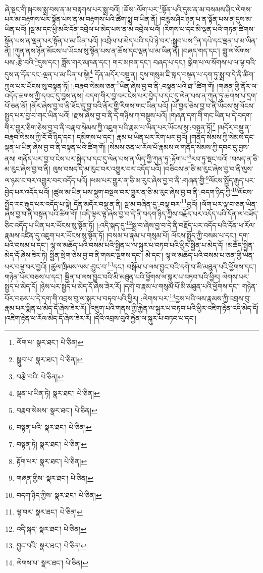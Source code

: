 ཞེ་སྡང་གི་སྐབས་སྨྲ་བས་ན་མ་བརྟགས་པར་སྨྲ་བའོ། །ཆོས་:ལོག་པར་\footnote{ལོག་པ་  སྣར་ཐང་།  པེ་ཅིན། }སྟོན་པའི་དུས་ན་མ་བསམས་ཤིང་ལེགས་པར་མ་བརྟགས་པར་སྟོན་པས་ན་མ་བརྟགས་པའི་ཚིག་སྨྲ་བ་ཡིན་ནོ། །བརྙས་ཤིང་ཉན་པ་ན་སྟོན་པས་ན་དུས་མ་ཡིན་པའོ། །སྔ་མ་དང་ཕྱི་མའི་དོན་འབྲེལ་པ་མེད་པས་ན་མ་འབྲེལ་པའོ། །རིགས་པ་དང་མི་ལྡན་པའི་གཏན་ཚིགས་སྟོན་པས་ན་ལྡན་པར་སྟོན་པ་མ་ཡིན་པའོ། །འབྲེལ་པ་མེད་པའི་དཔེ་ཉེ་བར་:སྒྲུབ་པས་\footnote{སྒྲུབ་པ་  སྣར་ཐང་།  པེ་ཅིན། }ན་དཔེ་དང་ལྡན་པ་མ་ཡིན་ནོ། །ཀུན་ནས་ཉོན་མོངས་པ་ཡོངས་སུ་སྟོན་པས་ན་ཆོས་དང་ལྡན་པ་མ་ཡིན་ནོ། །བཞད་གད་དང་། གླུ་ལ་སོགས་པས་:རྩེ་བའི་\footnote{བརྩེ་བའི་  པེ་ཅིན། }དུས་དང་། ཟློས་གར་མཁན་དང་། གར་མཁན་དང་། བཞད་པ་དང་། སྒེག་པ་ལ་སོགས་པ་ལ་ལྟ་བའི་དུས་ན་དོན་དང་:ལྡན་པ་མ་ཡིན་པ་སྟེ།\footnote{ལྡན་པ་ཡིན་ཏེ།  སྣར་ཐང་།  པེ་ཅིན། } དོན་མདོར་བསྡུ་ན། དུས་གསུམ་ཇི་སྐད་བསྟན་པ་དག་ཏུ་སྨྲ་བ་དེ་ནི་ཚིག་ཀྱལ་པར་ཡོངས་སུ་བསྟན་ཏོ། །:བརྣབ་སེམས་ཅན་\footnote{བརྣབ་སེམས་  སྣར་ཐང་།  པེ་ཅིན། }ཡིན་ཞེས་བྱ་བ་ནི་:བསྟན་པའི་ཐ་\footnote{བསྟན་པའི་  སྣར་ཐང་།  པེ་ཅིན། }ཚིག་གོ། །གཞན་གྱི་ནོར་ལ་འདོད་ཆགས་ཀྱི་དབང་དུ་བྱས་ནས། བདག་གིར་བྱ་བར་ངེས་པར་བྱེད་པ་དང་དུ་ལེན་པས་ན་ཀུན་ཏུ་ཆགས་པ་དྲག་པོ་ཅན་ནོ། །ནོར་ཞེས་བྱ་བ་ནི་ཟོང་དུ་བྱ་བའི་ནོར་གྱི་རིགས་གང་ཡིན་པའོ། །ཡོ་བྱད་ཅེས་བྱ་བ་ནི་ཡོངས་སུ་ལོངས་སྤྱད་པར་བྱ་བ་གང་ཡིན་པའོ། །རྫས་ཞེས་བྱ་བ་ནི་དེ་གཉིས་ཀ་བསྡུས་པའོ། །གཞན་དག་གི་གང་ཡིན་པ་དེ་བདག་གིར་གྱུར་ཅིག་ཅེས་བྱ་བ་ནི་བརྣབ་སེམས་ཀྱི་འཇུག་པའི་རྣམ་པ་ཡིན་པར་ཡོངས་སུ་:བསྟན་ཏོ།\footnote{བསྟན་ཏེ།  སྣར་ཐང་།  པེ་ཅིན། } །མདོར་བསྡུ་ན་བརྣབ་སེམས་ཀྱི་ངོ་བོ་ཉིད་དང་། དམིགས་པ་དང་། རྣམ་པ་ཡིན་པར་རིག་པར་བྱའོ། །གནོད་སེམས་ཀྱི་སེམས་དང་ལྡན་པ་ཡིན་ཞེས་བྱ་བ་ནི་བསྟན་པའི་ཚིག་གོ། །སེམས་ཅན་ཕ་རོལ་པོ་རྣམས་ལ་གནོད་སེམས་ཀྱི་དབང་དུ་བྱས་ནས། གནོད་པར་བྱ་བ་ངེས་པར་སྐྱེད་པ་དང་དུ་ལེན་པས་ན་ཡིད་ཀྱི་ཀུན་ཏུ་:རྟོག་པ་\footnote{རྟོག་པར་  སྣར་ཐང་།  པེ་ཅིན། }རབ་ཏུ་སྡང་བའོ། །བསད་ན་ཅི་མ་རུང་ཞེས་བྱ་བ་ནི། ལུས་བསད་དེ་མ་རུང་བར་འགྱུར་བར་འདོད་པའོ། །བཅིངས་ན་ཅི་མ་རུང་ཞེས་བྱ་བ་ནི་ལུས་ལ་ཉམ་ང་བར་འགྱུར་བར་འདོད་པའོ། །ཕམ་པར་གྱུར་ན་ཅི་མ་རུང་ཞེས་བྱ་བ་ནི་:གཞན་གྱི་\footnote{གཞན་གྱིས་  སྣར་ཐང་།  པེ་ཅིན། }ལོངས་སྤྱོད་རྒུད་པར་བྱེད་པར་འདོད་པའོ། །ཚུལ་མ་ཡིན་པས་སྡུག་བསྔལ་བར་གྱུར་ན་ཅི་མ་རུང་ཞེས་བྱ་བ་ནི་:བདག་ཉིད་ཀྱི་\footnote{བདག་ཉིད་ཀྱིས་  སྣར་ཐང་།  པེ་ཅིན། }ལོངས་སྤྱོད་རང་རྒུད་པར་འདོད་པ་སྟེ། དོན་མདོར་བསྡུ་ན་ནི། སྔ་མ་བཞིན་དུ་:བལྟ་བར་\footnote{ལྟ་བར་  སྣར་ཐང་།  པེ་ཅིན། }བྱའོ། །ལོག་པར་ལྟ་བ་ཅན་ཡིན་ཞེས་བྱ་བ་ནི་བསྟན་པའི་ཚིག་གོ། །འདི་ལྟར་ལྟ་ཞེས་བྱ་བ་དེ་ནི་བདག་ཉིད་ཀྱིས་བརྗོད་པར་འདོད་པའི་དོན་ལ་བཟོད་ཅིང་འདོད་པ་ཡིན་པར་ཡོངས་སུ་སྟོན་ཏོ། །:འདི་སྐད་དུ་\footnote{འདི་སྐད་  སྣར་ཐང་།  པེ་ཅིན། }སྨྲ་བ་ཞེས་བྱ་བ་དེ་ནི་བརྗོད་པར་འདོད་པའི་དོན་ཕ་རོལ་རྣམས་འཛིན་དུ་འཇུག་པར་ཡོངས་སུ་སྟོན་ཏོ། །བསམ་པ་རྣམ་པ་གསུམ་པོ། ལོངས་སྤྱོད་ཀྱི་བསམ་པ་དང་། དག་པའི་བསམ་པ་དང་། ལྷ་ལ་མཆོད་པའི་བསམ་པའི་སྦྱིན་པ་ལ་སྐུར་པ་བཏབ་པའི་ཕྱིར་སྦྱིན་པ་མེད་དོ། །མཆོད་སྦྱིན་མེད་དོ་ཞེས་ཟེར་ཏེ། སྦྱིན་སྲེག་ཅེས་བྱ་བ་ནི་གསང་སྔགས་དང་། མེ་དང་། ལྷ་ལ་མཆོད་པའི་བསམ་པ་ཅན་གྱི་ཡིན་པར་བལྟ་བར་བྱའོ། །ཚུལ་ཁྲིམས་ལས་:བྱུང་བ་\footnote{བྱུང་བའི་  སྣར་ཐང་།  པེ་ཅིན། }དང་། བསྒོམ་པ་ལས་བྱུང་བའི་དགེ་བ་མི་མཐུན་པའི་ཕྱོགས་དང་། གཉེན་པོར་བཅས་པ་དང་། སྦྱིན་པ་ལས་བྱུང་བའི་མི་མཐུན་པའི་ཕྱོགས་ལ་སྐུར་པ་བཏབ་པའི་ཕྱིར། ལེགས་པར་སྤྱད་པ་མེད་དོ། །ཉེས་པར་སྤྱད་པ་མེད་དོ་ཞེས་ཟེར་རོ། །དགེ་བ་རྣམ་པ་གསུམ་པོ་མི་མཐུན་པའི་ཕྱོགས་དང་། གཉེན་པོར་བཅས་པ་དེ་དག་གི་འབྲས་བུ་ལ་སྐུར་པ་བཏབ་པའི་ཕྱིར། :ལེགས་པར་\footnote{ལེགས་པ་  སྣར་ཐང་།  པེ་ཅིན། }བྱས་པའི་ལས་རྣམས་ཀྱི་འབྲས་བུ་རྣམ་པར་སྨིན་པ་མེད་དོ་ཞེས་ཟེར་རོ། །འཇུག་པའི་གནས་ཀྱི་རྐྱེན་ལ་སྐུར་པ་བཏབ་པའི་ཕྱིར་འཇིག་རྟེན་འདི་མེད་དོ། །འཇིག་རྟེན་ཕ་རོལ་མེད་དོ་ཞེས་ཟེར་རོ། །དེའི་འབྲས་བུའི་རྐྱེན་ལ་སྐུར་པ་བཏབ་པ་དང་། 
